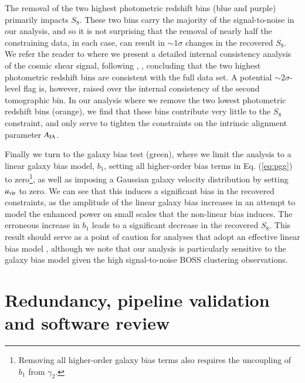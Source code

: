 \begin{appendix}
The removal of the two highest photometric redshift bins (blue and purple) primarily impacts $S_8$.   
These two bins carry the majority of the signal-to-noise in our analysis, and so it is not surprising that the removal of nearly half the constraining data, in each case, can result in $\sim 1 \sigma$ changes in the recovered $S_8$.   
We refer the reader to \citet{asgari/etal:inprep} where we present a detailed internal consistency analysis of the cosmic shear signal, following \citet{kohlinger/etal:2019}, \citep[see also][]{efstathiou/lemos:2018},  concluding that the two highest photometric redshift bins are consistent with the full data set.   
A potential $\sim 2\sigma$-level flag is, however, raised over the internal consistency of the second tomographic bin.  
In our analysis where we remove the two lowest photometric redshift bins (orange), we find that these bins contribute very little to the $S_8$ constraint, and only serve to tighten the constraints on the intrinsic alignment parameter $A_{\rm IA}$.

Finally we turn to the galaxy bias test (green), where we limit the analysis to a linear galaxy bias model, $b_1$, setting all higher-order bias terms in Eq. (\ref{eq:pgg}) to zero\footnote{Removing all higher-order galaxy bias terms also requires the uncoupling of $b_1$ from $\gamma_2$.}, as well as imposing a Gaussian galaxy velocity distribution by setting $a_{\rm vir}$ to zero.   
We can see that this induces a significant bias in the recovered constraints, as the amplitude of the linear galaxy bias increases in an attempt to model the enhanced power on small scales that the non-linear bias induces.   
The erroneous increase in $b_1$ leads to a significant decrease in the recovered $S_8$.  This result should serve as a point of caution for \tttp analyses that adopt an effective linear bias model \citep[see also the discussion in][]{asgari/etal:2020}, although we note that our analysis is particularly sensitive to the galaxy bias model given the high signal-to-noise BOSS clustering observations.


\section{Redundancy, pipeline validation and software review}
\label{app:codereview}


\end{appendix}
